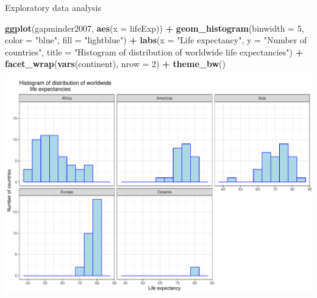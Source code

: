 \documentclass[
  ignorenonframetext,
]{beamer}
\newenvironment{Shaded}{\begin{snugshade}}{\end{snugshade}}
\newcommand{\AttributeTok}[1]{\textcolor[rgb]{0.13,0.29,0.53}{#1}}
\newcommand{\DecValTok}[1]{\textcolor[rgb]{0.00,0.00,0.81}{#1}}
\newcommand{\FunctionTok}[1]{\textcolor[rgb]{0.13,0.29,0.53}{\textbf{#1}}}
\newcommand{\NormalTok}[1]{#1}
\newcommand{\SpecialCharTok}[1]{\textcolor[rgb]{0.81,0.36,0.00}{\textbf{#1}}}
\newcommand{\StringTok}[1]{\textcolor[rgb]{0.31,0.60,0.02}{#1}}
\begin{document}
\begin{frame}[fragile]{Exploratory data analysis}
\protect\hypertarget{exploratory-data-analysis-5}{}
\small

\begin{Shaded}
\begin{Highlighting}[]
\FunctionTok{ggplot}\NormalTok{(gapminder2007, }\FunctionTok{aes}\NormalTok{(}\AttributeTok{x =}\NormalTok{ lifeExp)) }\SpecialCharTok{+}
  \FunctionTok{geom\_histogram}\NormalTok{(}\AttributeTok{binwidth =} \DecValTok{5}\NormalTok{, }\AttributeTok{color =} \StringTok{"blue"}\NormalTok{,}
                 \AttributeTok{fill =} \StringTok{"lightblue"}\NormalTok{) }\SpecialCharTok{+}
  \FunctionTok{labs}\NormalTok{(}\AttributeTok{x =} \StringTok{"Life expectancy"}\NormalTok{, }
       \AttributeTok{y =} \StringTok{"Number of countries"}\NormalTok{,}
       \AttributeTok{title =} \StringTok{"Histogram of distribution of worldwide }
\StringTok{       life expectancies"}\NormalTok{) }\SpecialCharTok{+}
  \FunctionTok{facet\_wrap}\NormalTok{(}\FunctionTok{vars}\NormalTok{(continent), }\AttributeTok{nrow =} \DecValTok{2}\NormalTok{) }\SpecialCharTok{+} 
  \FunctionTok{theme\_bw}\NormalTok{()}
\end{Highlighting}
\end{Shaded}

\begin{center}\includegraphics[width=0.8\linewidth,height=0.45\textheight]{Week5_Lect_files/figure-beamer/unnamed-chunk-7-1} \end{center}
\normalsize
\end{frame}
\end{document}
